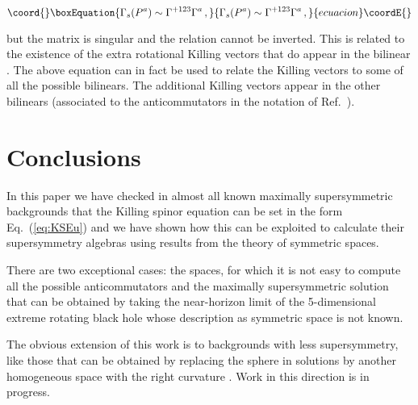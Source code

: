 \documentclass[12pt,a4paper]{article}
\begin{document}
\begin{equation}\coord{}\boxEquation{
\Gamma_{s}(P^{a})\sim \Gamma^{+123}\Gamma^{a}\, ,  
}{
\Gamma_{s}(P^{a})\sim \Gamma^{+123}\Gamma^{a}\, ,  
}{ecuacion}\coordE{}\end{equation}

\noindent
but the matrix \coordHE{} is singular and the relation cannot be
inverted. This is related to the existence of the extra rotational
Killing vectors \coordHE{} that do appear in the bilinear
\coordHE{}
\cite{Figueroa-O'Farrill:2001nz}. The above equation can in fact be
used to relate the Killing vectors \coordHE{} to some of all the
possible bilinears. The additional Killing vectors \coordHE{} appear
in the other bilinears (associated to the anticommutators
\coordHE{} in the notation of
Ref.~\cite{Figueroa-O'Farrill:2001nz}).



\section{Conclusions}
\label{sec-conclusions}

In this paper we have checked in almost all known maximally
supersymmetric backgrounds that the Killing spinor equation can be set
in the form Eq.~(\ref{eq:KSEu}) and we have shown how this can be
exploited to calculate their supersymmetry algebras using results from
the theory of symmetric spaces. 

There are two exceptional cases: the \coordHE{} spaces, for which it is not
easy to compute all the possible anticommutators
\coordHE{} and the maximally supersymmetric
solution that can be obtained by taking the near-horizon limit of the
5-dimensional extreme rotating black hole
\cite{Kallosh:1996vy,Gauntlett:1998fz,Cvetic:1998xh} whose description
as symmetric space is not known.

The obvious extension of this work is to backgrounds with less
supersymmetry, like those that can be obtained by replacing the sphere
in \coordHE{} solutions by another homogeneous space with the right
curvature \cite{Castellani:1983yg,Duff:1995wk,Castellani:1998nz}. Work
in this direction is in progress.
\end{document}
